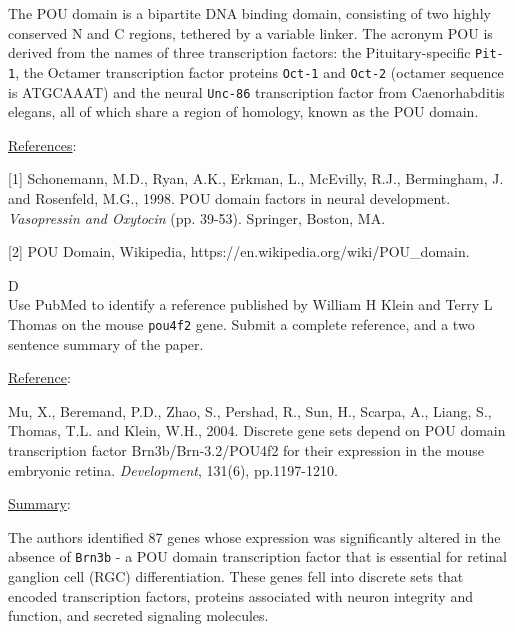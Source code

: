 \documentclass[12pt]{article}
\begin{document}
\begin{solution}

The POU domain is a bipartite DNA binding domain, consisting of two highly conserved N and C regions, tethered by a variable linker. The acronym POU is derived from the names of three transcription factors: the Pituitary-specific \texttt{Pit-1}, the Octamer transcription factor proteins \texttt{Oct-1} and \texttt{Oct-2} (octamer sequence is ATGCAAAT) and the neural \texttt{Unc-86} transcription factor from Caenorhabditis elegans, all of which share a region of homology, known as the POU domain. 


\underline{References}:

[1] Schonemann, M.D., Ryan, A.K., Erkman, L., McEvilly, R.J., Bermingham, J. and Rosenfeld, M.G., 1998. POU domain factors in neural development. \emph{Vasopressin and Oxytocin} (pp. 39-53). Springer, Boston, MA.

[2] POU Domain, Wikipedia, https://en.wikipedia.org/wiki/POU\_domain.

\end{solution}

\begin{problem}{D}
\text{ }\\
Use PubMed to identify a reference published by William H Klein and Terry L Thomas on the mouse \texttt{pou4f2} gene. Submit a complete reference, and a two sentence summary of the paper. 
\end{problem}
 
\begin{solution}
\text{}

\underline{Reference}: 

Mu, X., Beremand, P.D., Zhao, S., Pershad, R., Sun, H., Scarpa, A., Liang, S., Thomas, T.L. and Klein, W.H., 2004. Discrete gene sets depend on POU domain transcription factor Brn3b/Brn-3.2/POU4f2 for their expression in the mouse embryonic retina. \emph{Development}, 131(6), pp.1197-1210.

\underline{Summary}:

The authors identified 87 genes whose expression was significantly altered in the absence of \texttt{Brn3b} - a POU domain transcription factor that is essential for retinal ganglion cell (RGC) differentiation. These genes fell into discrete sets that encoded transcription factors, proteins associated with neuron integrity and function, and secreted signaling molecules. 

\end{solution}
\end{document}
